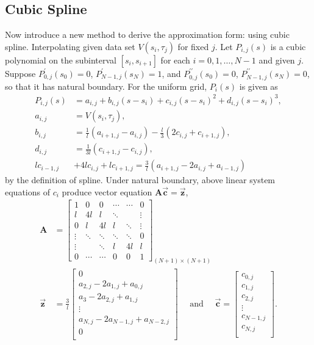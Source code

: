 	\subsection{Cubic Spline}
		Now introduce a new method to derive the approximation form: using cubic spline. Interpolating given data set $V(s_i,\tau_j)$ for fixed $j$.  Let $P_{i,j}(s)$ is a cubic polynomial on the subinterval $[s_i,s_{i+1}]$ for each $i=0,1,\dots,N-1$ and given $j$. Suppose $P^\prime_{0,j}(s_0) = 0$, $P^\prime_{N-1,j}(s_N) = 1$, and $P^{\prime\prime}_{0,j}(s_0) = 0$, $P^{\prime\prime}_{N-1,j}(s_N) = 0$, so that it has natural boundary. For the uniform grid, $P_i(s)$ is given as
		\begin{align*}
			P_{i,j}(s) &= a_{i,j} + b_{i,j}(s-s_i) + c_{i,j}(s-s_i)^2 + d_{i,j}(s-s_i)^3,\\
			a_{i,j} &= V(s_i,\tau_j),\\
			b_{i,j} &= \frac{1}{l}(a_{i+1,j}-a_{i,j}) - \frac{l}{3}(2c_{i,j}+c_{i+1,j}),\\
			d_{i,j} &= \frac{1}{3l}(c_{i+1,j}-c_{i,j}),\\
			lc_{i-1,j}&+4lc_{i,j}+lc_{i+1,j} = \frac{3}{l}(a_{i+1,j}-2a_{i,j}+a_{i-1,j})
		\end{align*}
		by the definition of spline. Under natural boundary, above linear system equations of $c_i$ produce vector equation $\mathbf{A}\vec{\mathbf{c}}=\vec{\mathbf{z}}$,
		\begin{align*}
			\mathbf{A} &= \begin{bmatrix}
				1 & 0 & 0 & \cdots & \cdots & 0 \\
				l & 4l & l & \ddots& \ & \vdots \\
				0 & l & 4l & l & \ddots &\vdots \\
				\vdots & \ddots & \ddots & \ddots & \ddots  & 0 \\
				\vdots & \ & \ddots & l & 4l & l \\
				0 & \cdots  & \cdots & 0 & 0 & 1 
			\end{bmatrix}_{(N+1)\times(N+1)}\\
			\vec{\mathbf{z}} & = \frac{3}{l}\begin{bmatrix}
				0\\
				a_{2,j}-2a_{1,j}+a_{0,j}\\
				a_3-2a_{2,j}+a_{1,j}\\
				\vdots\\
				a_{N,j}-2a_{N-1,j}+a_{N-2,j}\\
				0\\
			\end{bmatrix}\quad\mbox{ and }\quad
			\vec{\mathbf{c}}= \begin{bmatrix}
				c_{0,j}\\
				c_{1,j}\\
				c_{2,j}\\
				\vdots\\
				c_{N-1,j}\\
				c_{N,j}\\
			\end{bmatrix}.
		\end{align*}
